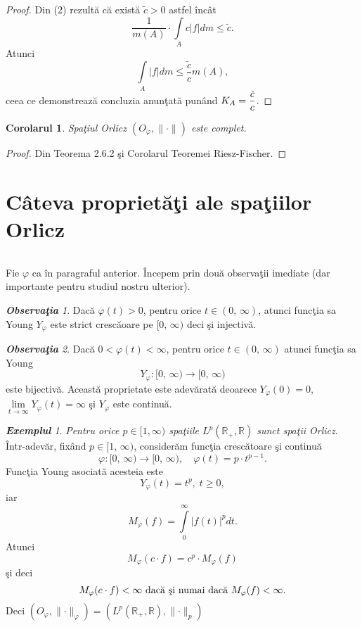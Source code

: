 \documentclass[ a4paper, 12pt]{report}
\newtheorem{cor}[theorem]{\bf Corolarul}
\theoremstyle{definition}
\theoremstyle{remark}
\newtheorem{obs}{\bf Observa\c tia }[section]
\newtheorem{exemple}{\bf Exemplul}[section]
\numberwithin{equation}{section}
\begin{document}
\begin{proof}
Din ($2$) rezult\u a c\u  a exist\u a $\tilde{c}>0$ astfel \^inc\^at
$$\frac{1}{m(A)} \cdot \int\limits_{A} c \lvert f \rvert dm \leq \tilde{c}.$$ Atunci
$$\int\limits_{A} \lvert f \rvert dm \leq \frac{\tilde{c}}{c} m(A),$$ ceea ce demonstreaz\u a concluzia anun\c tat\u a pun\^ and $K_A  = \displaystyle\frac{\tilde{c}}{c}$.
\end{proof}


\begin{cor}
Spa\c tiul Orlicz $(O_\varphi,\lVert \cdot \rVert)$ este complet.
\end{cor}

\begin{proof}
Din Teorema 2.6.2 \c si Corolarul Teoremei Riesz-Fischer.
\end{proof}


\newpage



\section{C\^ ateva propriet\u a\c ti ale spa\c tiilor Orlicz}

$\, $

\vspace{1cm}

Fie $\varphi$ ca \^in paragraful anterior. \^ Incepem prin dou\u a observa\c tii imediate (dar importante pentru studiul nostru ulterior).
\begin{obs}
Dac\u a $\varphi(t)>0$, pentru orice $t \in (0,\, \infty)$, atunci func\c tia sa Young $Y_\varphi$ este strict cresc\u aoare pe $[0, \, \infty)$ deci \c si injectiv\u a.
\end{obs}

\begin{obs}
Dac\u a $0< \varphi(t) < \infty$, pentru orice $t\in (0, \, \infty)$ atunci func\c tia sa Young
$$Y_\varphi : [0,\, \infty) \rightarrow [0, \, \infty)$$ este bijectiv\u a. Aceast\u a proprietate este adev\u arat\u a deoarece
$Y_\varphi(0) = 0$, $\lim\limits_{t \rightarrow \infty} Y_\varphi(t) = \infty$ \c si $Y_\varphi$ este continu\u a.
\end{obs}

\begin{exemple}
\emph{Pentru orice $p \in [1,\infty)$ spa\c tiile  $L^p(\mathbb{R}_+, \mathbb{R})$ sunct spa\c tii Orlicz}. \^ Intr-adev\u ar, fix\^ and $p \in [1, \, \infty)$, consider\u am func\c tia cresc\u atoare \c si continu\u a
$$\varphi : [0,\, \infty) \rightarrow [0, \, \infty), \quad \varphi(t) = p \cdot t^{p-1}.$$ Func\c tia Young asociat\u a acesteia este
$$Y_\varphi(t) = t^p, \; t \geq 0,$$ iar
$$ M_\varphi(f) = \int\limits_{0}^{\infty}\lvert f(t) \rvert^p dt.$$ Atunci
$$M_\varphi(c \cdot f) = c^p \cdot M_\varphi(f)$$ \c si deci
$$M_\varphi(c \cdot f) < \infty \hbox{ dac\u a \c si numai dac\u a } M_\varphi(f) < \infty.$$
Deci
$(O_\varphi, \lVert \cdot \rVert_\varphi) = (L^p(\mathbb{R}_+, \mathbb{R}), \lVert \cdot \rVert_p)$
\end{exemple}
\end{document}
